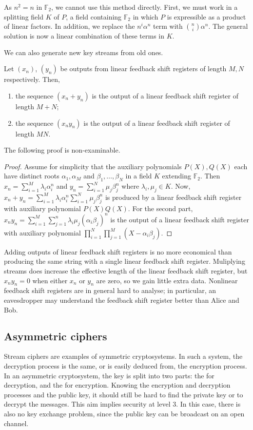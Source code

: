 As $n^2 = n$ in $\mathbb F_2$, we cannot use this method directly.
First, we must work in a splitting field $K$ of $P$, a field containing $\mathbb F_2$ in which $P$ is expressible as a product of linear factors.
In addition, we replace the $n^i \alpha^n$ term with $\binom{n}{i} \alpha^n$.
The general solution is now a linear combination of these terms in $K$.

We can also generate new key streams from old ones.
\begin{lemma}
    Let $(x_n)$, $(y_n)$ be outputs from linear feedback shift registers of length $M, N$ respectively.
    Then,
    \begin{enumerate}
        \item the sequence $(x_n + y_n)$ is the output of a linear feedback shift register of length $M + N$;
        \item the sequence $(x_n y_n)$ is the output of a linear feedback shift register of length $MN$.
    \end{enumerate}
\end{lemma}
The following proof is non-examinable.
\begin{proof}
    Assume for simplicity that the auxiliary polynomials $P(X), Q(X)$ each have distinct roots $\alpha_1, \alpha_M$ and $\beta_1, \dots, \beta_N$ in a field $K$ extending $\mathbb F_2$.
    Then $x_n = \sum_{i=1}^M \lambda_i \alpha_i^n$ and $y_n = \sum_{i=1}^N \mu_j \beta_j^n$ where $\lambda_i, \mu_j \in K$.
    Now, $x_n + y_n = \sum_{i=1}^M \lambda_i \alpha_i^n \sum_{i=1}^N \mu_j \beta_j^n$ is produced by a linear feedback shift register with auxiliary polynomial $P(X) Q(X)$.
    For the second part, $x_n y_n = \sum_{i=1}^M \sum_{j=1}^n \lambda_i \mu_j (\alpha_i \beta_j)^n$ is the output of a linear feedback shift register with auxiliary polynomial $\prod_{i=1}^N \prod_{j=1}^M (X - \alpha_i \beta_j)$.
\end{proof}
Adding outputs of linear feedback shift registers is no more economical than producing the same string with a single linear feedback shift register.
Muliplying streams does increase the effective length of the linear feedback shift register, but $x_n y_n = 0$ when either $x_n$ or $y_n$ are zero, so we gain little extra data.
Nonlinear feedback shift registers are in general hard to analyse; in particular, an eavesdropper may understand the feedback shift register better than Alice and Bob.

\subsection{Asymmetric ciphers}
Stream ciphers are examples of symmetric cryptosystems.
In such a system, the decryption process is the same, or is easily deduced from, the encryption process.
In an asymmetric cryptosystem, the key is split into two parts: the  for decryption, and the  for encryption.
Knowing the encryption and decryption processes and the public key, it should still be hard to find the private key or to decrypt the messages.
This aim implies security at level 3.
In this case, there is also no key exchange problem, since the public key can be broadcast on an open channel.


